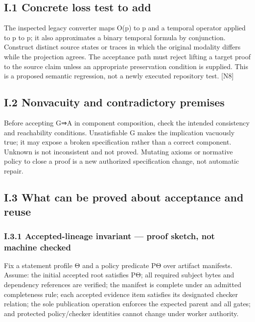 \documentclass{article}
\begin{document}
\subsection*{I.1 Concrete loss test to add}

The inspected legacy converter maps O(p) to p and a temporal operator applied to p to p; it also
approximates a binary temporal formula by conjunction. Construct distinct source states or traces
in which the original modality differs while the projection agrees. The acceptance path must reject
lifting a target proof to the source claim unless an appropriate preservation condition is supplied. This
is a proposed semantic regression, not a newly executed repository test. [N8]

\subsection*{I.2 Nonvacuity and contradictory premises}

Before accepting G⇒A in component composition, check the intended consistency and reachability
conditions. Unsatisfiable G makes the implication vacuously true; it may expose a broken specification
rather than a correct component. Unknown is not inconsistent and not proved. Mutating axioms or
normative policy to close a proof is a new authorized specification change, not automatic repair.

\subsection*{I.3 What can be proved about acceptance and reuse}

\subsubsection*{I.3.1 Accepted-lineage invariant — proof sketch, not machine checked}
Fix a statement profile Θ and a policy predicate PΘ over artifact manifests. Assume: the initial
accepted root satisfies PΘ; all required subject bytes and dependency references are verified; the
manifest is complete under an admitted completeness rule; each accepted evidence item satisfies its
designated checker relation; the sole publication operation enforces the expected parent and all gates;
and protected policy/checker identities cannot change under worker authority.
\end{document}
